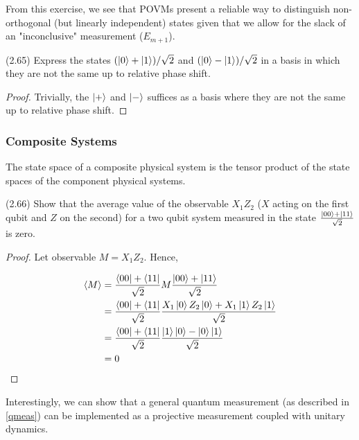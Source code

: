 \documentclass[main.tex]{subfiles}
\begin{document}
\begin{subappendices}
From this exercise, we see that POVMs present a reliable way to distinguish non-orthogonal (but linearly independent) states given that we allow for the slack of an "inconclusive" measurement ($E_{m+1}$). 

\begin{exercise} (2.65) Express the states $(\ket{0} + \ket{1})/\sqrt{2}$ and $(\ket{0} - \ket{1})/\sqrt{2}$ in a basis in which they are not the same up to relative phase shift.

\begin{proof}
Trivially, the $\ket{+}$ and $\ket{-}$ suffices as a basis where they are not the same up to relative phase shift.	
\end{proof}

	
\end{exercise}

\subsubsection{Composite Systems}

The state space of a composite physical system is the tensor product of the state spaces of the component physical systems. 

\begin{exercise} (2.66)
	Show that the average value of the observable $X_1Z_2$ ($X$ acting on the first qubit and $Z$ on the second) for a two qubit system measured in the state $\frac{\ket{00} + \ket{11}}{\sqrt{2}}$ is zero.
\end{exercise}

\begin{proof}
	Let observable $M = X_1Z_2$. Hence, 
	
	\begin{align*}
	\langle M \rangle &= \frac{\bra{00} + \bra{11}}{\sqrt{2}} M \frac{\ket{00} + \ket{11}}{\sqrt{2}}\\	
	&= \frac{\bra{00} + \bra{11}}{\sqrt{2}}\frac{X_1\ket{0}Z_2\ket{0} + X_1\ket{1}Z_2\ket{1}}{\sqrt{2}} \\
	&= \frac{\bra{00} + \bra{11}}{\sqrt{2}}\frac{\ket{1}\ket{0} - \ket{0}\ket{1}}{\sqrt{2}} \\
	&= 0
	\end{align*}
\end{proof}
 
Interestingly, we can show that a general quantum measurement (as described in \ref{qmeas}) can be implemented as a projective measurement coupled with unitary dynamics.


\end{subappendices}
\end{document}
